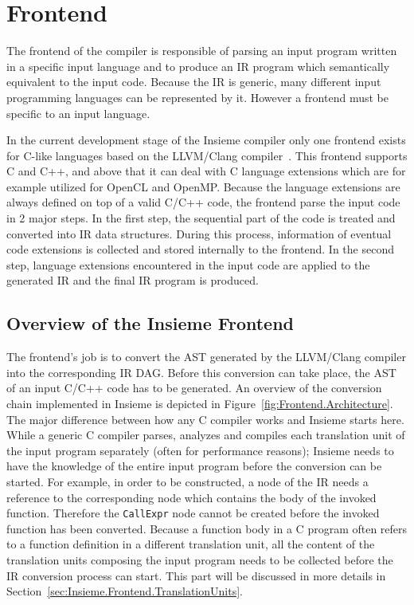 \section{Frontend}
\label{sec:Insieme.Frontend}

The frontend of the compiler is responsible of parsing an input program written
in a specific input language and to produce an IR program which semantically
equivalent to the input code. Because the IR is generic, many different input
programming languages can be represented by it. However a frontend must be
specific to an input language.

In the current development stage of the Insieme compiler only one frontend
exists for C-like languages based on the LLVM/Clang compiler~\cite{clang}. This
frontend supports C and C++, and above that it can deal with C language
extensions which are for example utilized for OpenCL and OpenMP. Because the
language extensions are always defined on top of a valid C/C++ code, the frontend
parse the input code in 2 major steps. In the first step, the sequential part of
the code is treated and converted into IR data structures. During this process,
information of eventual code extensions is collected and stored internally to
the frontend. In the second step, language extensions encountered in the input
code are applied to the generated IR and the final IR program is produced.  

\subsection{Overview of the Insieme Frontend}
\label{sec:Insieme.Frontend.Overview}

The frontend's job is to convert the AST generated by the LLVM/Clang compiler
into the corresponding IR DAG. Before this conversion can take place, the AST of
an input C/C++ code has to be generated. An overview of the conversion chain
implemented in Insieme is depicted in Figure~\ref{fig:Frontend.Architecture}.
The major difference between how any C compiler works and Insieme starts here.
While a generic C compiler parses, analyzes and compiles each translation unit
of the input program separately (often for performance reasons); Insieme needs
to have the knowledge of the entire input program before the conversion can be
started. For example, in order to be constructed, a  node of
the IR needs a reference to the corresponding  node which
contains the body of the invoked function.  Therefore the \texttt{CallExpr} node
cannot be created before the invoked function has been converted. Because a
function body in a C program often refers to a function definition in a
different translation unit, all the content of the translation units composing
the input program needs to be collected before the IR conversion process can
start.  This part will be discussed in more details in
Section~\ref{sec:Insieme.Frontend.TranslationUnits}.

